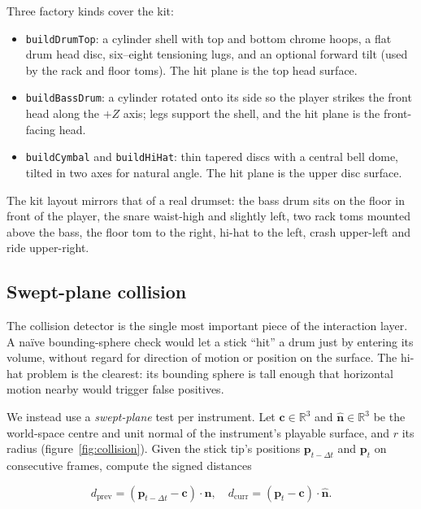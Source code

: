 \documentclass[11pt,a4paper]{article}
\begin{document}
Three factory kinds cover the kit:

\begin{itemize}[leftmargin=2em]
    \item \texttt{buildDrumTop}: a cylinder shell with top and bottom
          chrome hoops, a flat drum head disc, six--eight tensioning
          lugs, and an optional forward tilt (used by the rack and
          floor toms). The hit plane is the top head surface.
    \item \texttt{buildBassDrum}: a cylinder rotated onto its side so
          the player strikes the front head along the $+Z$ axis;
          legs support the shell, and the hit plane is the
          front-facing head.
    \item \texttt{buildCymbal} and \texttt{buildHiHat}: thin tapered
          discs with a central bell dome, tilted in two axes for
          natural angle. The hit plane is the upper disc surface.
\end{itemize}

The kit layout mirrors that of a real drumset: the bass drum sits on
the floor in front of the player, the snare waist-high and slightly
left, two rack toms mounted above the bass, the floor tom to the
right, hi-hat to the left, crash upper-left and ride upper-right.

\subsection{Swept-plane collision}

The collision detector is the single most important piece of the
interaction layer. A na\"ive bounding-sphere check would let a stick
``hit'' a drum just by entering its volume, without regard for
direction of motion or position on the surface. The hi-hat problem is
the clearest: its bounding sphere is tall enough that horizontal
motion nearby would trigger false positives.

We instead use a \emph{swept-plane} test per instrument. Let
$\mathbf{c}\in\mathbb{R}^3$ and $\hat{\mathbf{n}}\in\mathbb{R}^3$ be
the world-space centre and unit normal of the instrument's playable
surface, and $r$ its radius (figure~\ref{fig:collision}). Given the
stick tip's positions $\mathbf{p}_{t-\Delta t}$ and $\mathbf{p}_t$ on
consecutive frames, compute the signed distances

\[
d_\text{prev} = (\mathbf{p}_{t-\Delta t} - \mathbf{c}) \cdot \hat{\mathbf{n}},
\quad
d_\text{curr} = (\mathbf{p}_{t} - \mathbf{c}) \cdot \hat{\mathbf{n}}.
\]
\end{document}
